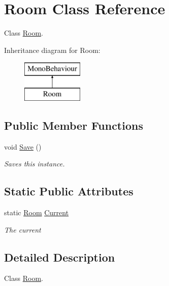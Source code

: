 \hypertarget{class_room}{}\section{Room Class Reference}
\label{class_room}


Class \hyperlink{class_room}{Room}.  


Inheritance diagram for Room\+:\begin{figure}[H]
\begin{center}
\leavevmode
\includegraphics[height=2.000000cm]{class_room}
\end{center}
\end{figure}
\subsection*{Public Member Functions}
\begin{DoxyCompactItemize}
\item 
void \hyperlink{class_room_a4f68e1dc04721a708c3663cc7e9020c3}{Save} ()
\begin{DoxyCompactList}\small\item\em Saves this instance. \end{DoxyCompactList}\end{DoxyCompactItemize}
\subsection*{Static Public Attributes}
\begin{DoxyCompactItemize}
\item 
static \hyperlink{class_room}{Room} \hyperlink{class_room_a68d55b64ae2e018accd029731c2ca354}{Current}
\begin{DoxyCompactList}\small\item\em The current \end{DoxyCompactList}\end{DoxyCompactItemize}


\subsection{Detailed Description}
Class \hyperlink{class_room}{Room}. 



